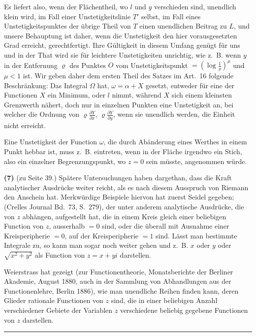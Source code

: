\documentclass[12pt,a4paper]{article}
\begin{document}
Es liefert also, wenn der Flächentheil, wo $l$ und $y$ verschieden sind, unendlich klein wird, im Fall einer Unstetigkeitslinie $T'$ selbst, im Fall eines Unstetigkeitspunktes der übrige Theil von $T$ einen unendlichen Beitrag zu $L$, und unsere Behauptung ist daher, wenn die Unstetigkeit den hier vorausgesetzten Grad erreicht, gerechtfertigt. Ihre Gültigkeit in diesem Umfang genügt für uns und in der That wird sie für leichtere Unstetigkeiten unrichtig, wie z.~B. wenn $y$ in der Entfernung $\varrho$ des Punktes $O$ vom Unstetigkeitspunkt $= \left(\log \frac{1}{\varrho}\right)^\mu$ und $\mu < 1$ ist. Wir geben daher dem ersten Theil des Satzes im Art.~16 folgende Beschränkung: Das Integral $\Omega$ hat, $\omega = \alpha + X$ gesetzt, entweder für eine der Functionen $X$ ein Minimum, oder $l$ nimmt, während $X$ sich einem kleinsten Grenzwerth nähert, doch nur in einzelnen Punkten eine Unstetigkeit an, bei welcher die Ordnung von $\varrho \frac{\partial Y}{\partial x}$, $\varrho \frac{\partial Y}{\partial y}$, wenn sie unendlich werden, die Einheit nicht erreicht.

Eine Unstetigkeit der Function $\omega$, die durch Abänderung eines Werthes in einem Punkt hebbar ist, muss z.~B. eintreten, wenn in der Fläche irgendwo ein Stich, also ein einzelner Begrenzungspunkt, wo $z = 0$ sein müsste, angenommen würde.

\textbf{(7)} (zu Seite 39.) Spätere Untersuchungen haben dargethan, dass die Kraft analytischer Ausdrücke weiter reicht, als es nach diesem Ausspruch von Riemann den Anschein hat. Merkwürdige Beispiele hiervon hat zuerst Seidel gegeben; (Crelles Journal Bd.~73, S.~279), der unter anderem analytische Ausdrücke, die von $z$ abhängen, aufgestellt hat, die in einem Kreis gleich einer beliebigen Function von $z$, ausserhalb $= 0$ sind, oder die überall mit Ausnahme einer Kreisperipherie $= 0$, auf der Kreisperipherie $= 1$ sind. Lässt man bestimmte Integrale zu, so kann man sogar noch weiter gehen und z.~B. $x$ oder $y$ oder $\sqrt{x^2 + y^2}$ als Function von $z = x + yi$ darstellen.

Weierstrass hat gezeigt (zur Functionentheorie, Monatsberichte der Berliner Akademie, August 1880, auch in der Sammlung von Abhandlungen aus der Functionenlehre, Berlin 1886), wie man unendliche Reihen finden kann, deren Glieder rationale Functionen von $z$ sind, die in einer beliebigen Anzahl verschiedener Gebiete der Variablen $z$ verschiedene beliebig gegebene Functionen von $z$ darstellen.

\vspace{2em}
\begin{center}
\rule{0.5\textwidth}{0.4pt}
\end{center}
\vspace{1em}
\end{document}
